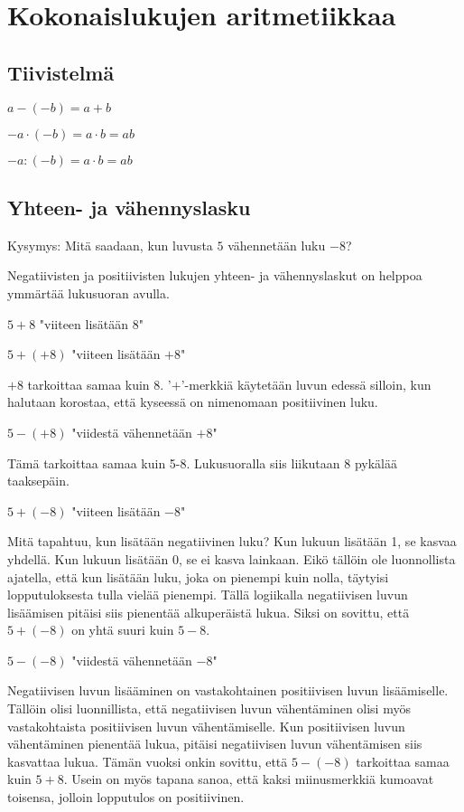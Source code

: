 \chapter{Kokonaislukujen aritmetiikkaa}

\section{Tiivistelmä}

$a-(-b)=a+b$

$-a\cdot (-b)=a\cdot b=ab$

$-a:(-b)=a\cdot b=ab$

\section{Yhteen- ja vähennyslasku}

Kysymys: Mitä saadaan, kun luvusta $5$ vähennetään luku $-8$?

Negatiivisten ja positiivisten lukujen yhteen- ja vähennyslaskut on helppoa ymmärtää lukusuoran avulla.

$5+8$ "viiteen lisätään $8$"


$5+(+8)$ "viiteen lisätään $+8$"

$+8$ tarkoittaa samaa kuin $8$. '$+$'-merkkiä käytetään luvun edessä silloin, kun halutaan korostaa, että kyseessä on nimenomaan positiivinen luku.


$5-(+8)$ "viidestä vähennetään $+8$"

Tämä tarkoittaa samaa kuin 5-8. Lukusuoralla siis liikutaan 8 pykälää taaksepäin.


$5+(-8)$ "viiteen lisätään $-8$"

Mitä tapahtuu, kun lisätään negatiivinen luku? Kun lukuun lisätään 1, se kasvaa yhdellä. Kun lukuun lisätään 0, se ei kasva lainkaan. Eikö tällöin ole luonnollista ajatella, että kun lisätään luku, joka on pienempi kuin nolla, täytyisi lopputuloksesta tulla vielää pienempi. Tällä logiikalla negatiivisen luvun lisäämisen pitäisi siis pienentää alkuperäistä lukua. Siksi on sovittu, että $5+(-8)$ on yhtä suuri kuin $5-8$.


$5-(-8)$ "viidestä vähennetään $-8$"

Negatiivisen luvun lisääminen on vastakohtainen positiivisen luvun lisäämiselle. Tällöin olisi luonnillista, että negatiivisen luvun vähentäminen olisi myös vastakohtaista positiivisen luvun vähentämiselle. Kun positiivisen luvun vähentäminen pienentää lukua, pitäisi negatiivisen luvun vähentämisen siis kasvattaa lukua. Tämän vuoksi onkin sovittu, että $5-(-8)$ tarkoittaa samaa kuin $5+8$. Usein on myös tapana sanoa, että kaksi miinusmerkkiä kumoavat toisensa, jolloin lopputulos on positiivinen.

